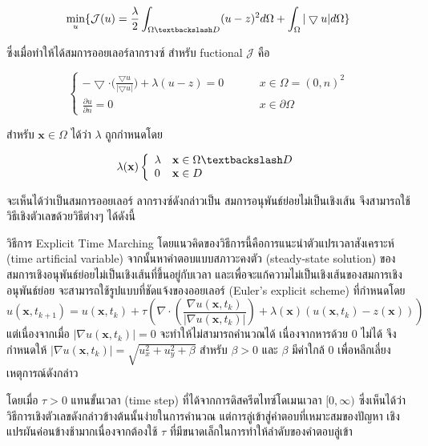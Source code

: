 \documentclass[hidelinks,a4paper,14pt]{article}
\numberwithin{equation}{section}							%
\begin{document}
{		$$\min_{u} \{ \mathcal{J}(u) = \frac{\lambda}{2} \int_{\Omega \textbackslash D} (u-z)^2 d\Omega +  \int_{\Omega}  |\bigtriangledown u|  d\Omega \}$$
	
		ซึ่งเมื่อทำให้ได้สมการออยเลอร์ลากรางซ์ สำหรับ fuctional $\mathcal{J}$ คือ 
		
		$$ \left \{ \begin{array}{ll}  - \bigtriangledown \cdot  \Big( \frac{\bigtriangledown u}{|\bigtriangledown u|} \Big) + \lambda (u-z) = 0  & \hspace{1cm} x \in \Omega = (0,n)^2 \\ \frac{\partial u}{\partial n} = 0 & \hspace{1cm} x \in \partial \Omega \end{array} \right . $$
		
		สำหรับ $\mathbf{x} \in \Omega$ ได้ว่า $\lambda$ ถูกกำหนดโดย
		
		$$ \lambda(\mathbf{x}) \left \{ \begin{array}{ll}  \lambda & \mathbf{x} \in \Omega \textbackslash D \\ 0 &\mathbf{x} \in D  \end{array} \right . $$
		
		จะเห็นได้ว่าเป็นสมการออยเลอร์ ลากรางซ์ดังกล่าวเป็น สมการอนุพันธ์ย่อยไม่เป็นเชิงเส้น จึงสามารถใช้วิธีเชิงตัวเลขด้วยวิธีต่างๆ ได้ดังนี้
		
		วิธีการ Explicit Time Marching  \cite{ref:ExplicitTimeMarching}  โดยแนวคิดของวิธีการนี้คือการแนะนําตัวแปรเวลาสังเคราะห์ (time artificial variable) จากนั้นหาคําตอบแบบสภาวะคงตัว (steady-state solution) ของสมการเชิงอนุพันธ์ย่อยไม่เป็นเชิงเส้นที่ขึ้นอยู่กับเวลา และเพื่อจะแก้ความไม่เป็นเชิงเส้นของสมการเชิงอนุพันธ์ย่อย จะสามารถใช้รูปแบบที่ชัดแจ้งของออยเลอร์ (Euler's explicit scheme) ที่กำหนดโดย
		$$
		u(\mathbf{x},t_{k+1})=u(\mathbf{x},t_{k})+\tau\left(\nabla\cdot\left(\frac{\nabla u ( \mathbf{x},t_k)}{\lvert \nabla u ( \mathbf{x},t_k) \rvert }\right) + \lambda(\mathbf{x})(u ( \mathbf{x},t_k)-z(\mathbf{x})) \right)
		$$
		แต่เนื่องจากเมื่อ $\lvert \nabla u ( \mathbf{x},t_k) \rvert = 0 $ จะทำให้ไม่สามารถคำนวณได้ เนื่องจากหารด้วย 0 ไม่ได้ จึงกำหนดให้ $\lvert \nabla u ( \mathbf{x},t_k) \rvert = \sqrt{u_x^2+u_y^2 + \beta}$ สำหรับ $\beta > 0$ และ $\beta$ มีค่าใกล้ 0 เพื่อหลีกเลี่ยงเหตุการณ์ดังกล่าว
		
		โดยเมื่อ $\tau>0$ แทนขั้นเวลา (time step) ที่ได้จากการดิสครีตไทซ์โดเมนเวลา $[0,\infty)$ ซึ่งเห็นได้ว่าวิธีการเชิงตัวเลขดังกล่าวข้างต้นนั้นง่ายในการคํานวณ แต่การลู่เข้าสู่คําตอบที่เหมาะสมของปัญหา เชิงแปรผันค่อนข้างช้ามากเนื่องจากต้องใช้ $\tau$ ที่มีขนาดเล็กในการทำให้ลำดับของคำตอบลู่เข้า 
		
}
\end{document}
